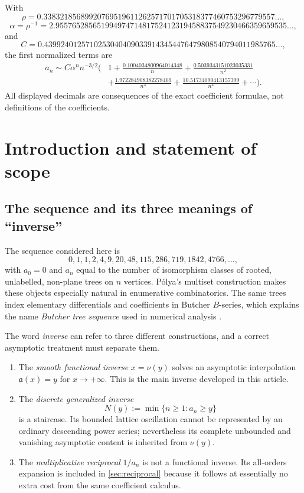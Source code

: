 \documentclass[11pt,oneside]{article}
\numberwithin{equation}{section}
\theoremstyle{plain}
\theoremstyle{definition}
\theoremstyle{remark}
\begin{document}
\begin{mainresultbox}
With
\[
\rho=0.33832185689920769519611262571701705318377460753296779557\ldots,
\]
\[
\alpha=\rho^{-1}=2.95576528565199497471481752412319458837549230466359659535\ldots,
\]
and
\[
 C=0.43992401257102530404090339143454476479808540794011985765\ldots,
\]
the first normalized terms are
\[
\begin{aligned}
 a_n\sim C\alpha^n n^{-3/2}\Biggl(&
 1+\frac{0.1004034800964014348}{n}
 +\frac{0.5039343151023035331}{n^2}\\[-1mm]
 &+\frac{1.972284908382278469}{n^3}
 +\frac{10.51734090413157399}{n^4}+\cdots\Biggr).
\end{aligned}
\]
All displayed decimals are consequences of the exact coefficient formulae,
not definitions of the coefficients.
\end{mainresultbox}

\tableofcontents
\clearpage

\section{Introduction and statement of scope}

\subsection{The sequence and its three meanings of ``inverse''}

The sequence considered here is
\[
 0,1,1,2,4,9,20,48,115,286,719,1842,4766,\ldots,
\]
with $a_0=0$ and $a_n$ equal to the number of isomorphism classes of rooted,
unlabelled, non-plane trees on $n$ vertices.  P\'olya's multiset construction
makes these objects especially natural in enumerative combinatorics.  The
same trees index elementary differentials and coefficients in Butcher
$B$-series, which explains the name \emph{Butcher tree sequence} used in
numerical analysis \cite{Butcher1972,McLachlan2017,OEISA000081}.

The word \emph{inverse} can refer to three different constructions, and a
correct asymptotic treatment must separate them.
\begin{enumerate}
\item The \emph{smooth functional inverse} $x=\nu(y)$ solves an asymptotic
      interpolation $\mathfrak a(x)=y$ for $x\to+\infty$.  This is the main
      inverse developed in this article.
\item The \emph{discrete generalized inverse}
      \[
       N(y):=\min\{n\ge1:a_n\ge y\}
      \]
      is a staircase.  Its bounded lattice oscillation cannot be represented
      by an ordinary descending power series; nevertheless its complete
      unbounded and vanishing asymptotic content is inherited from $\nu(y)$.
\item The \emph{multiplicative reciprocal} $1/a_n$ is not a functional
      inverse.  Its all-orders expansion is included in \cref{sec:reciprocal}
      because it follows at essentially no extra cost from the same
      coefficient calculus.
\end{enumerate}
\end{document}
